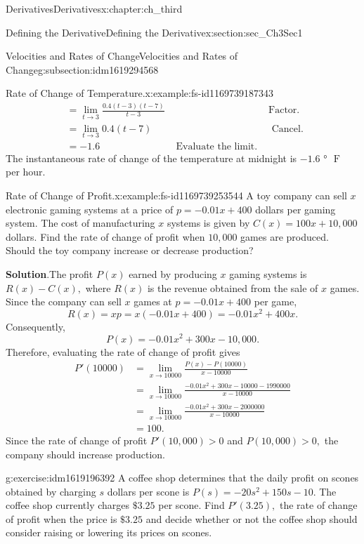 \documentclass[oneside,10pt,]{book}
\newcommand{\blocktitlefont}{\relax}
\numberwithin{equation}{section}
\newcommand{\gt}{>}
\newcommand{\amp}{&}
\begin{document}
\begin{chapterptx}{Derivatives}{}{Derivatives}{}{}{x:chapter:ch_third}
\begin{sectionptx}{Defining the Derivative}{}{Defining the Derivative}{}{}{x:section:sec_Ch3Sec1}
\begin{subsectionptx}{Velocities and Rates of Change}{}{Velocities and Rates of Change}{}{}{g:subsection:idm1619294568}
\begin{example}{Rate of Change of Temperature.}{x:example:fs-id1169739187343}
\begin{align*}
\amp=\lim_{t\to 3}\frac{0.4(t-3)(t-7)}{t-3}\amp\amp \text{Factor.}\\
\amp=\lim_{t\to 3}0.4(t-7)\amp\amp\text{ Cancel. }\\
\amp=-1.6\amp\text{ Evaluate the limit. }
\end{align*}
The instantaneous rate of change of the temperature at midnight is \(-1.6\text{ ° }\text{ F }\) per hour.%
\end{example}
\begin{example}{Rate of Change of Profit.}{x:example:fs-id1169739253544}%
A toy company can sell \(x\) electronic gaming systems at a price of \(p=-0.01x+400\) dollars per gaming system. The cost of manufacturing \(x\) systems is given by \(C(x)=100x+10,000\) dollars. Find the rate of change of profit when \(10,000\) games are produced. Should the toy company increase or decrease production?%
\par\smallskip%
\noindent\textbf{\blocktitlefont Solution}.\hypertarget{g:solution:idm1619201128}{}\quad{}The profit \(P(x)\) earned by producing \(x\) gaming systems is \(R(x)-C(x),\) where \(R(x)\) is the revenue obtained from the sale of \(x\) games. Since the company can sell \(x\) games at \(p=-0.01x+400\) per game,%
%
\begin{equation*}
R(x)=xp=x(-0.01x+400)=-0.01x^2+400x.
\end{equation*}
Consequently,%
%
\begin{equation*}
P(x)=-0.01x^2+300x-10,000.
\end{equation*}
Therefore, evaluating the rate of change of profit gives%
%
\begin{align*}
P'(10000)\amp=\lim_{x\to 10000}\frac{P(x)-P(10000)}{x-10000}\\
\amp=\lim_{x\to 10000}\frac{-0.01x^2+300x-10000-1990000}{x-10000}\\
\amp=\lim_{x\to 10000}\frac{-0.01x^2+300x-2000000}{x-10000}\\
\amp=100.
\end{align*}
Since the rate of change of profit \(P'(10,000)\gt 0\) and \(P(10,000)\gt 0,\) the company should increase production.%
\end{example}
\begin{inlineexercise}{}{g:exercise:idm1619196392}%
A coffee shop determines that the daily profit on scones obtained by charging \(s\) dollars per scone is \(P(s)=-20s^2+150s-10.\) The coffee shop currently charges \(\$3.25\) per scone. Find \(P'(3.25),\) the rate of change of profit when the price is \(\$3.25\) and decide whether or not the coffee shop should consider raising or lowering its prices on scones.%

\end{inlineexercise}
\end{subsectionptx}
\end{sectionptx}
\end{chapterptx}
\end{document}
